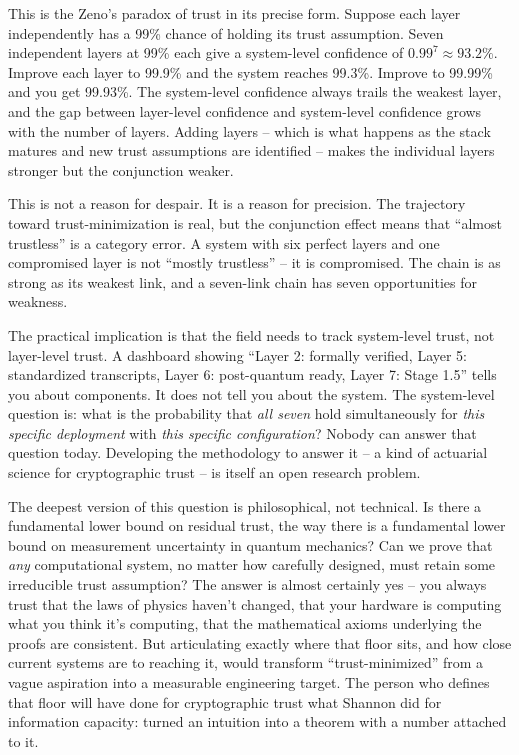 \documentclass[
  11pt,
  openany]{report}
\begin{document}
This is the Zeno's paradox of trust in its precise form. Suppose each layer
independently has a 99\% chance of holding its trust assumption. Seven
independent layers at 99\% each give a system-level confidence of
\(0.99^7 \approx 93.2\%\). Improve each layer to 99.9\% and the system reaches
99.3\%. Improve to 99.99\% and you get 99.93\%. The system-level confidence
always trails the weakest layer, and the gap between layer-level confidence and
system-level confidence grows with the number of layers. Adding layers -- which
is what happens as the stack matures and new trust assumptions are identified --
makes the individual layers stronger but the conjunction weaker.

This is not a reason for despair. It is a reason for precision. The trajectory
toward trust-minimization is real, but the conjunction effect means that
``almost trustless'' is a category error. A system with six perfect layers and
one compromised layer is not ``mostly trustless'' -- it is compromised. The
chain is as strong as its weakest link, and a seven-link chain has seven
opportunities for weakness.

The practical implication is that the field needs to track system-level trust,
not layer-level trust. A dashboard showing ``Layer 2: formally verified, Layer
5: standardized transcripts, Layer 6: post-quantum ready, Layer 7: Stage 1.5''
tells you about components. It does not tell you about the system. The
system-level question is: what is the probability that \emph{all seven} hold
simultaneously for \emph{this specific deployment} with \emph{this specific
configuration}? Nobody can answer that question today. Developing the
methodology to answer it -- a kind of actuarial science for cryptographic trust
-- is itself an open research problem.

The deepest version of this question is philosophical, not technical. Is there a
fundamental lower bound on residual trust, the way there is a fundamental lower
bound on measurement uncertainty in quantum mechanics? Can we prove that
\emph{any} computational system, no matter how carefully designed, must retain
some irreducible trust assumption? The answer is almost certainly yes -- you
always trust that the laws of physics haven't changed, that your hardware is
computing what you think it's computing, that the mathematical axioms underlying
the proofs are consistent. But articulating exactly where that floor sits, and
how close current systems are to reaching it, would transform
``trust-minimized'' from a vague aspiration into a measurable engineering
target. The person who defines that floor will have done for cryptographic trust
what Shannon did for information capacity: turned an intuition into a theorem
with a number attached to it.
\end{document}
